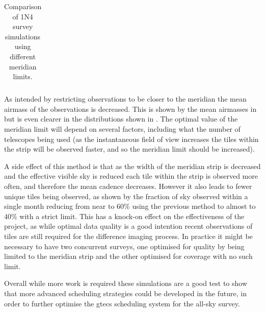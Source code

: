 \begin{colsection}
\begin{colsection}
\begin{table}[t]
\begin{center}
\begin{tabular}{c|cc|c|c|c}
    \end{tabular}
    \end{center}
    \caption[Comparison of survey simulations using a meridian limit]{
        Comparison of 1N4 survey simulations using different meridian limits.
    }\label{tab:survey_sim_meridian}
\end{table}

As intended by restricting observations to be closer to the meridian the mean airmass of the observations is decreased. This is shown by the mean airmasses in  but is even clearer in the distributions shown in . The optimal value of the meridian limit will depend on several factors, including what the number of telescopes being used (as the instantaneous field of view increases the tiles within the strip will be observed faster, and so the meridian limit should be increased).

A side effect of this method is that as the width of the meridian strip is decreased and the effective visible sky is reduced each tile within the strip is observed more often, and therefore the mean cadence decreases. However it also leads to fewer unique tiles being observed, as shown by the fraction of sky observed within a single month reducing from near to 60\% using the previous method to almost to 40\% with a strict limit. This has a knock-on effect on the effectiveness of the project, as while optimal data quality is a good intention recent observations of tiles are still required for the difference imaging process. In practice it might be necessary to have two concurrent surveys, one optimised for quality by being limited to the meridian strip and the other optimised for coverage with no such limit.

Overall while more work is required these simulations are a good test to show that more advanced scheduling strategies could be developed in the future, in order to further optimise the \gls{gtecs} scheduling system for the all-sky survey.

\end{colsection}


\end{colsection}

